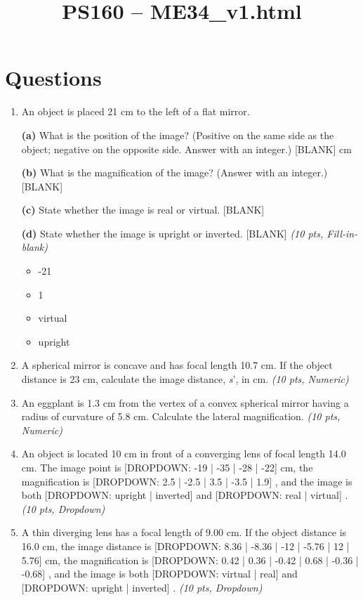 \documentclass[11pt]{article}
\title{PS160 -- ME34\_v1.html}
\date{}
\begin{document}
\maketitle

\section*{Questions}

\begin{enumerate}[leftmargin=*]
  \item An object is placed 21 cm to the left of a flat mirror.

\textbf{(a)} What is the position of the image? (Positive on the same side as the object; negative on the opposite side. Answer with an integer.) [BLANK]
cm

\textbf{(b)} What is the magnification of the image? (Answer with an integer.) [BLANK]

\textbf{(c)} State whether the image is real or virtual. [BLANK]

\textbf{(d)} State whether the image is upright or inverted. [BLANK] \hfill \textit{(10 pts, Fill-in-blank)}
    \begin{itemize}
      \item -21
      \item 1
      \item virtual
      \item upright
    \end{itemize}

  \item A spherical mirror is concave and has focal length 10.7 cm. If the object distance is 23 cm, calculate the image distance, \emph{s}', in cm. \hfill \textit{(10 pts, Numeric)}

  \item An eggplant is 1.3 cm from the vertex of a convex spherical mirror having a radius of curvature of 5.8 cm. Calculate the lateral magnification. \hfill \textit{(10 pts, Numeric)}

  \item An object is located 10 cm in front of a converging lens of focal length 14.0 cm. The image point is [DROPDOWN: -19 | -35 | -28 | -22]
cm, the magnification is [DROPDOWN: 2.5 | -2.5 | 3.5 | -3.5 | 1.9]
, and the image is both [DROPDOWN: upright | inverted]
and [DROPDOWN: real | virtual]
. \hfill \textit{(10 pts, Dropdown)}

  \item A thin diverging lens has a focal length of 9.00 cm. If the object distance is 16.0 cm, the image distance is [DROPDOWN: 8.36 | -8.36 | -12 | -5.76 | 12 | 5.76]
cm, the magnification is [DROPDOWN: 0.42 | 0.36 | -0.42 | 0.68 | -0.36 | -0.68]
, and the image is both [DROPDOWN: virtual | real]
and [DROPDOWN: upright | inverted]
. \hfill \textit{(10 pts, Dropdown)}


\end{enumerate}
\end{document}
